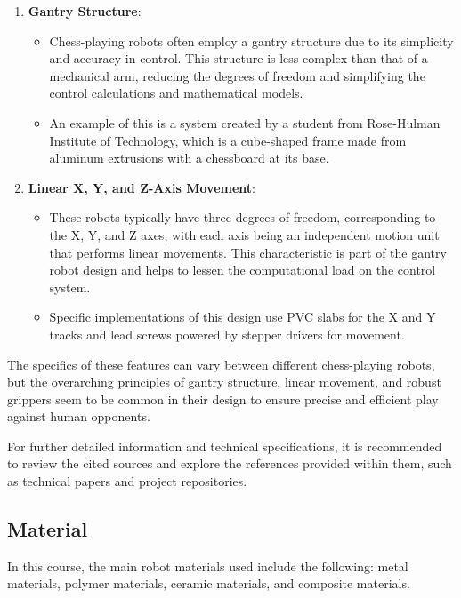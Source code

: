 \documentclass[10pt, a4paper, twocolumn]{article}
\begin{document}
\begin{enumerate}
    \item \textbf{Gantry Structure}:
    \begin{itemize}
        \item Chess-playing robots often employ a gantry structure due to its simplicity and accuracy in control. This structure is less complex than that of a mechanical arm, reducing the degrees of freedom and simplifying the control calculations and mathematical models.\cite{rao2023robot}
        \item An example of this is a system created by a student from Rose-Hulman Institute of Technology, which is a cube-shaped frame made from aluminum extrusions with a chessboard at its base.\cite{arduino2021chessrobot}
    \end{itemize}
    
    \item \textbf{Linear X, Y, and Z-Axis Movement}:
    \begin{itemize}
        \item These robots typically have three degrees of freedom, corresponding to the X, Y, and Z axes, with each axis being an independent motion unit that performs linear movements. This characteristic is part of the gantry robot design and helps to lessen the computational load on the control system.\cite{du2013compliance}
        \item Specific implementations of this design use PVC slabs for the X and Y tracks and lead screws powered by stepper drivers for movement.\cite{baichtal2017chess}
    \end{itemize}
\end{enumerate}

The specifics of these features can vary between different chess-playing robots, but the overarching principles of gantry structure, linear movement, and robust grippers seem to be common in their design to ensure precise and efficient play against human opponents.

For further detailed information and technical specifications, it is recommended to review the cited sources and explore the references provided within them, such as technical papers and project repositories.

\subsection{Material}
In this course, the main robot materials used include the following: metal materials, polymer materials, ceramic materials, and composite materials.
\end{document}
